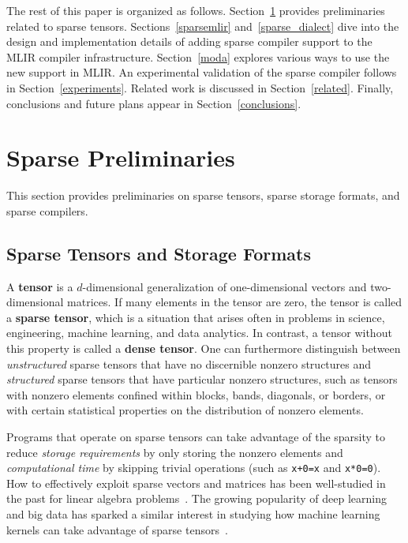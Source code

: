 \documentclass[10pt]{article}
\begin{document}
The rest of this paper is organized as follows. Section~\ref{prelim} provides preliminaries related to sparse tensors. Sections~\ref{sparsemlir} and~\ref{sparse_dialect} dive into the design and implementation details of adding sparse compiler support to the MLIR compiler infrastructure. Section~\ref{moda} explores various ways to use the new support in MLIR. An experimental validation of the sparse compiler follows in Section~\ref{experiments}. Related work is discussed in Section~\ref{related}. Finally, conclusions and future plans appear in Section~\ref{conclusions}.

\section{Sparse Preliminaries}
\label{prelim}

This section provides preliminaries on sparse tensors, sparse storage formats, and sparse compilers.

\subsection{Sparse Tensors and Storage Formats}

A \textbf{tensor} is a $d$-dimensional generalization of one-dimensional vectors and two-dimensional matrices. If many elements in the tensor are zero, the tensor is called a \textbf{sparse tensor}, which is a situation that arises often in problems in science, engineering, machine learning, and data analytics. In contrast, a tensor without this property is called a \textbf{dense tensor}. One can furthermore distinguish between \emph{unstructured} sparse tensors that have no discernible nonzero structures and \emph{structured} sparse tensors that have particular nonzero structures, such as tensors with nonzero elements confined within blocks, bands, diagonals, or borders, or with certain statistical properties on the distribution of nonzero elements.

Programs that operate on sparse tensors can take advantage of the sparsity to reduce \emph{storage requirements} by only storing the nonzero elements and \emph{computational time} by skipping trivial operations (such as \verb|x+0=x| and \verb|x*0=0|). How to effectively exploit sparse vectors and matrices has been well-studied in the past for linear algebra problems~\cite{anderson,coleman,curtis71,duffo,duff,duff5,evans,george,harary,mann,sergio,marinus,liu,reid2,tewarson,zlatev}. The growing popularity of deep learning and big data has sparked a similar interest in studying how machine learning kernels can take advantage of sparse tensors~\cite{chou2018,drkjolstad,taco2018,taco2017,senanayake2020,fiber,tew2016}.
\end{document}
